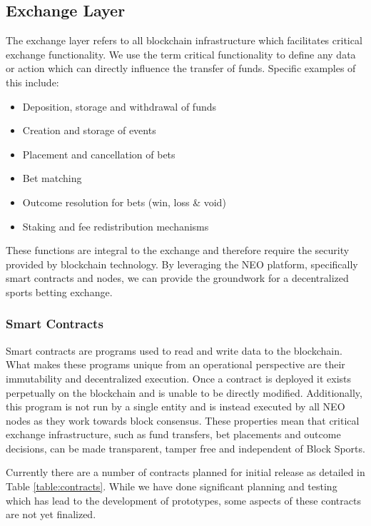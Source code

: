 \documentclass{article}
\begin{document}
	\subsection{Exchange Layer}

The exchange layer refers to all blockchain infrastructure which facilitates critical exchange functionality. We use the term critical functionality to define any data or action which can directly influence the transfer of funds. Specific examples of this include:

\begin{itemize}
	\item Deposition, storage and withdrawal of funds
	\item Creation and storage of events
	\item Placement and cancellation of bets
	\item Bet matching
	\item Outcome resolution for bets (win, loss \& void)
	\item Staking and fee redistribution mechanisms
\end{itemize}

These functions are integral to the exchange and therefore require the security provided by blockchain technology. By leveraging the NEO platform, specifically smart contracts and nodes, we can provide the groundwork for a decentralized sports betting exchange.



		\subsubsection{Smart Contracts}
Smart contracts are programs used to read and write data to the blockchain. What makes these programs unique from an operational perspective are their immutability and decentralized execution. Once a contract is deployed it exists perpetually on the blockchain and is unable to be directly modified. Additionally, this program is not run by a single entity and is instead executed by all NEO nodes as they work towards block consensus. These properties mean that critical exchange infrastructure, such as fund transfers, bet placements and outcome decisions, can be made transparent, tamper free and independent of Block Sports.

Currently there are a number of contracts planned for initial release as detailed in Table \ref{table:contracts}. While we have done significant planning and testing which has lead to the development of prototypes, some aspects of these contracts are not yet finalized.
\end{document}
